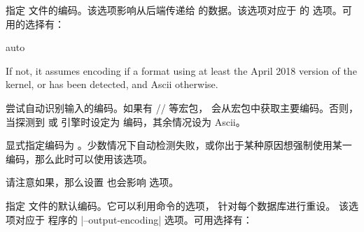 \begin{optionlist}
指定  文件的编码。该选项影响从后端传递给 \biblatex  的数据。该选项对应于 \biber 的  选项。可用的选择有：

\begin{valuelist}

\item[auto] %

If not, it assumes \utf encoding if a \latex format using at least the April 2018 version of the kernel, \xetex or \luatex has been detected, and Ascii otherwise.

尝试自动识别输入的编码。如果有 \slash{}\slash{} 等宏包，
\biblatex 会从宏包中获取主要编码。否则，当探测到 \XeTeX 或 \LuaTeX 引擎时设定为 \utf 编码，其余情况设为 Ascii。

\item[\prm{encoding}] %
显式指定编码为 。少数情况下自动检测失败，或你出于某种原因想强制使用某一编码，那么此时可以使用该选项。

\end{valuelist}
%
请注意如果，那么设置  也会影响  选项。


指定  文件的默认编码。它可以利用命令的选项，
针对每个数据库进行重设。
该选项对应于 \biber 程序的 |--output-encoding| 选项。可用选择有：


\end{optionlist}
